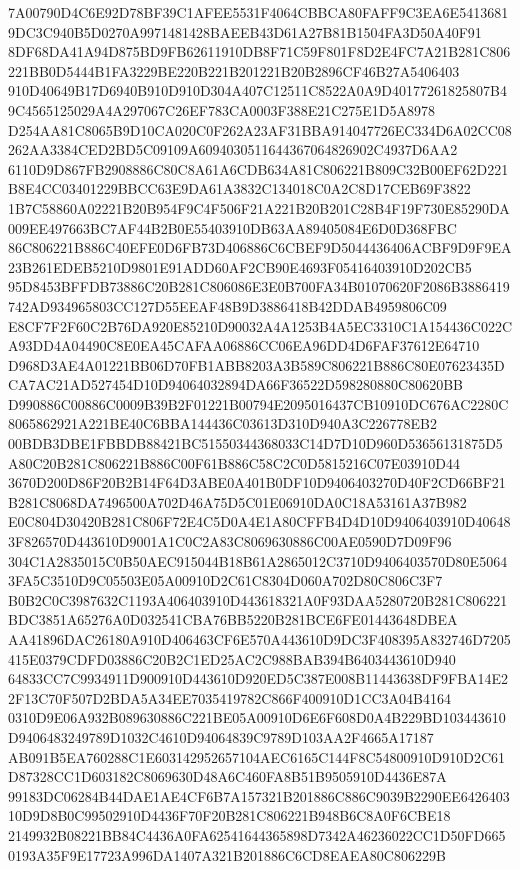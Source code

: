 \documentclass[UTF8,fontset=fandol,zihao=-4,a4paper]{ctexart}
\begin{document}
{{7A00790D4C6E92D78BF39C1AFEE5531F4064CBBCA80FAFF9C3EA6E54136819DC3C940B5D0270A9971481428BAEEB43D61A27B81B1504FA3D50A40F91
8DF68DA41A94D875BD9FB62611910DB8F71C59F801F8D2E4FC7A21B281C806221BB0D5444B1FA3229BE220B221B201221B20B2896CF46B27A5406403
910D40649B17D6940B910D910D304A407C12511C8522A0A9D40177261825807B49C4565125029A4A297067C26EF783CA0003F388E21C275E1D5A8978
D254AA81C8065B9D10CA020C0F262A23AF31BBA914047726EC334D6A02CC08262AA3384CED2BD5C09109A6094030511644367064826902C4937D6AA2
6110D9D867FB2908886C80C8A61A6CDB634A81C806221B809C32B00EF62D221B8E4CC03401229BBCC63E9DA61A3832C134018C0A2C8D17CEB69F3822
1B7C58860A02221B20B954F9C4F506F21A221B20B201C28B4F19F730E85290DA009EE497663BC7AF44B2B0E55403910DB63AA89405084E6D0D368FBC
86C806221B886C40EFE0D6FB73D406886C6CBEF9D5044436406ACBF9D9F9EA23B261EDEB5210D9801E91ADD60AF2CB90E4693F05416403910D202CB5
95D8453BFFDB73886C20B281C806086E3E0B700FA34B01070620F2086B3886419742AD934965803CC127D55EEAF48B9D3886418B42DDAB4959806C09
E8CF7F2F60C2B76DA920E85210D90032A4A1253B4A5EC3310C1A154436C022CA93DD4A04490C8E0EA45CAFAA06886CC06EA96DD4D6FAF37612E64710
D968D3AE4A01221BB06D70FB1ABB8203A3B589C806221B886C80E07623435DCA7AC21AD527454D10D94064032894DA66F36522D598280880C80620BB
D990886C00886C0009B39B2F01221B00794E2095016437CB10910DC676AC2280C8065862921A221BE40C6BBA144436C03613D310D940A3C226778EB2
00BDB3DBE1FBBDB88421BC51550344368033C14D7D10D960D53656131875D5A80C20B281C806221B886C00F61B886C58C2C0D5815216C07E03910D44
3670D200D86F20B2B14F64D3ABE0A401B0DF10D9406403270D40F2CD66BF21B281C8068DA7496500A702D46A75D5C01E06910DA0C18A53161A37B982
E0C804D30420B281C806F72E4C5D0A4E1A80CFFB4D4D10D9406403910D406483F826570D443610D9001A1C0C2A83C8069630886C00AE0590D7D09F96
304C1A2835015C0B50AEC915044B18B61A2865012C3710D9406403570D80E50643FA5C3510D9C05503E05A00910D2C61C8304D060A702D80C806C3F7
B0B2C0C3987632C1193A406403910D443618321A0F93DAA5280720B281C806221BDC3851A65276A0D032541CBA76BB5220B281BCE6FE01443648DBEA
AA41896DAC26180A910D406463CF6E570A443610D9DC3F408395A832746D7205415E0379CDFD03886C20B2C1ED25AC2C988BAB394B6403443610D940
64833CC7C9934911D900910D443610D920ED5C387E008B11443638DF9FBA14E22F13C70F507D2BDA5A34EE7035419782C866F400910D1CC3A04B4164
0310D9E06A932B089630886C221BE05A00910D6E6F608D0A4B229BD103443610D9406483249789D1032C4610D94064839C9789D103AA2F4665A17187
AB091B5EA760288C1E603142952657104AEC6165C144F8C54800910D910D2C61D87328CC1D603182C8069630D48A6C460FA8B51B9505910D4436E87A
99183DC06284B44DAE1AE4CF6B7A157321B201886C886C9039B2290EE642640310D9D8B0C99502910D4436F70F20B281C806221B948B6C8A0F6CBE18
2149932B08221BB84C4436A0FA62541644365898D7342A46236022CC1D50FD6650193A35F9E17723A996DA1407A321B201886C6CD8EAEA80C806229B
}}
\end{document}
